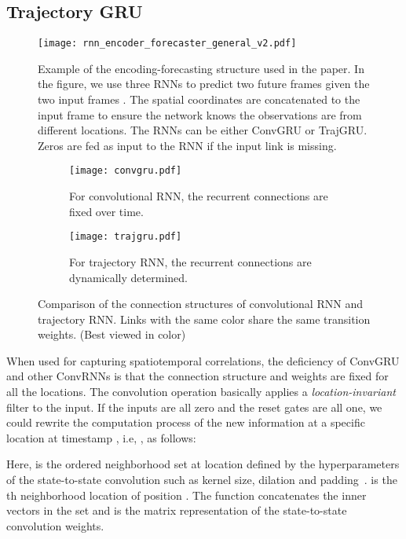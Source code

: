 \documentclass{article}
\begin{document}
\subsection{Trajectory GRU}
\begin{figure}[tb!]
    \centering
    \begin{minipage}[tb!]{0.58\textwidth}
    \texttt{[image: rnn\_encoder\_forecaster\_general\_v2.pdf]}
    \caption{Example of the encoding-forecasting structure used in the paper. In the figure, we use three RNNs to predict two future frames  given the two input frames . The spatial coordinates  are concatenated to the input frame to ensure the network knows the observations are from different locations. The RNNs can be either ConvGRU or TrajGRU. Zeros are fed as input to the RNN if the input link is missing.}
    \label{fig:rnn_encoder_forecaster}
    \end{minipage}
    \hfill
    \begin{minipage}{0.38\textwidth}
    \begin{subfigure}[tb!]{\textwidth}
        \texttt{[image: convgru.pdf]}
        \caption{For convolutional RNN, the recurrent connections are fixed over time.}
        \label{fig:structure:conv_rnn}
    \end{subfigure}
    \quad
    \begin{subfigure}[tb!]{\textwidth}
        \texttt{[image: trajgru.pdf]}
        \caption{For trajectory RNN, the recurrent connections are dynamically determined.}
    \end{subfigure}
    \caption{Comparison of the connection structures of convolutional RNN and trajectory RNN. Links with the same color share the same transition weights. (Best viewed in color)}
    \label{fig:structure_convrnn_trajrnn}
    \end{minipage}
    \vspace{-1em}
\end{figure}

When used for capturing spatiotemporal correlations, the deficiency of ConvGRU and other \mbox{ConvRNNs} is that the connection structure and weights are fixed for all the locations. The convolution operation basically applies a \emph{location-invariant} filter to the input. If the inputs are all zero and the reset gates are all one, we could rewrite the computation process of the new information at a specific location  at timestamp , i.e, , as follows:

Here,  is the ordered neighborhood set at location  defined by the hyperparameters of the state-to-state convolution such as kernel size, dilation and padding~\cite{yu2016multi}.  is the th neighborhood location of position . The  function concatenates the inner vectors in the set and  is the matrix representation of the state-to-state convolution weights.
\end{document}
